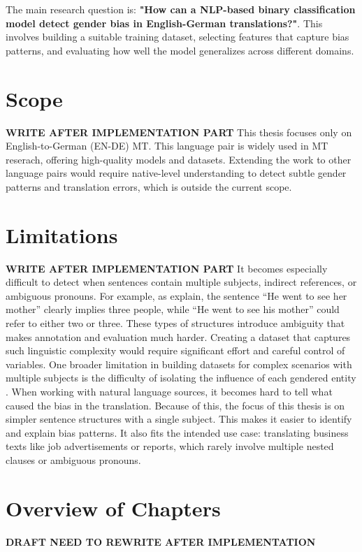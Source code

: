 The main research question is: \textbf{"How can a NLP-based binary classification model detect gender bias in English-German translations?"}. This involves building a suitable training dataset, selecting features that capture bias patterns, and evaluating how well the model generalizes across different domains.

\section{Scope}

\textbf{WRITE AFTER IMPLEMENTATION PART}
This thesis focuses only on English-to-German (EN-DE) MT. This language pair is widely used in MT reserach, offering high-quality models and datasets. Extending the work to other language pairs would require native-level understanding to detect subtle gender patterns and translation errors, which is outside the current scope. 

\section{Limitations}
\textbf{WRITE AFTER IMPLEMENTATION PART}
It becomes especially difficult to detect when sentences contain multiple subjects, indirect references, or ambiguous pronouns. For example, as \citet{barclayInvestigatingMarkersDrivers2024a} explain, the sentence “He went to see her mother” clearly implies three people, while “He went to see his mother” could refer to either two or three. These types of structures introduce ambiguity that makes annotation and evaluation much harder. Creating a dataset that captures such linguistic complexity would require significant effort and careful control of variables. One broader limitation in building datasets for complex scenarios with multiple subjects is the difficulty of isolating the influence of each gendered entity \citep{lardelliBuildingBridgesDataset2024}. When working with natural language sources, it becomes hard to tell what caused the bias in the translation. Because of this, the focus of this thesis is on simpler sentence structures with a single subject. This makes it easier to identify and explain bias patterns. It also fits the intended use case: translating business texts like job advertisements or reports, which rarely involve multiple nested clauses or ambiguous pronouns.
 

\section{Overview of Chapters}
\textbf{DRAFT NEED TO REWRITE AFTER IMPLEMENTATION}
